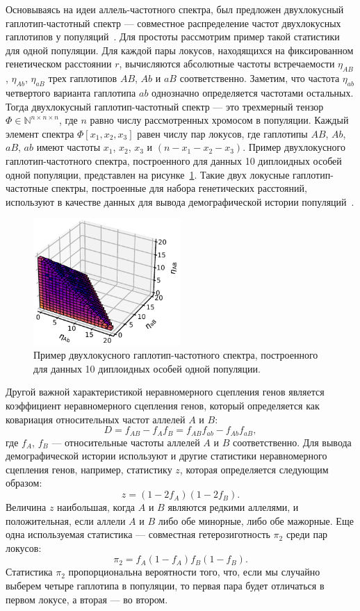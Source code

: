 Основываясь на идеи аллель-частотного спектра, был предложен двухлокусный гаплотип-частотный спектр --- совместное распределение частот двухлокусных гаплотипов у популяций~\cite{ragsdale2017inferring}.
Для простоты рассмотрим пример такой статистики для одной популяции.
Для каждой пары локусов, находящихся на фиксированном генетическом расстоянии $r$, вычисляются абсолютные частоты встречаемости $\eta_{AB}$, $\eta_{Ab}$, $\eta_{aB}$ трех гаплотипов $AB$, $Ab$ и $aB$ соответственно.
Заметим, что частота $\eta_{ab}$ четвертого варианта гаплотипа $ab$ однозначно определяется частотами остальных.
Тогда двухлокусный гаплотип-частотный спектр --- это трехмерный тензор $\Phi \in \mathbb{N}^{n\times n\times n}$, где $n$ равно числу рассмотренных хромосом в популяции.
Каждый элемент спектра $\Phi[x_1, x_2, x_3]$ равен числу пар локусов, где гаплотипы $AB$, $Ab$, $aB$, $ab$ имеют частоты $x_1$, $x_2$, $x_3$ и $(n-x_1-x_2-x_3)$.
Пример двухлокусного гаплотип-частотного спектра, построенного для данных 10 диплоидных особей одной популяции, представлен на рисунке~\ref{fig:part1:dem_inf:ld_data}.
Такие двух локусные гаплотип-частотные спектры, построенные для набора генетических расстояний, используют в качестве данных для вывода демографической истории популяций~\cite{ragsdale2017inferring}.

\begin{figure}
    \centering
    \includegraphics[width=0.5\textwidth]{images/part1/data/two_locus_spectrum.pdf}
    \caption{Пример двухлокусного гаплотип-частотного спектра, построенного для данных 10 диплоидных особей одной популяции.}
    \label{fig:part1:dem_inf:ld_data}
\end{figure}

Другой важной характеристикой неравномерного сцепления генов является коэффициент неравномерного сцепления генов, который определяется как ковариация относительных частот аллелей $A$ и $B$:
$$D = f_{AB} - f_{A} f_B = f_{AB}f_{ab} - f_{Ab} f_{aB},$$
где $f_A$, $f_B$ --- относительные частоты аллелей $A$ и $B$ соответственно.
Для вывода демографической истории используют и другие статистики неравномерного сцепления генов, например, статистику $z$, которая определяется следующим образом:
$$z = (1 - 2 f_A)(1 - 2 f_B).$$
Величина $z$ наибольшая, когда $A$ и $B$ являются редкими аллелями, и положительная, если аллели $A$ и $B$ либо обе минорные, либо обе мажорные.
Еще одна используемая статистика --- совместная гетерозиготность $\pi_2$ среди пар локусов:
$$\pi_2 = f_A(1 - f_A)f_B(1 - f_B).$$
Статистика $\pi_2$ пропорциональна вероятности того, что, если мы случайно выберем четыре гаплотипа в популяции, то первая пара будет отличаться в первом локусе, а вторая --- во втором.

